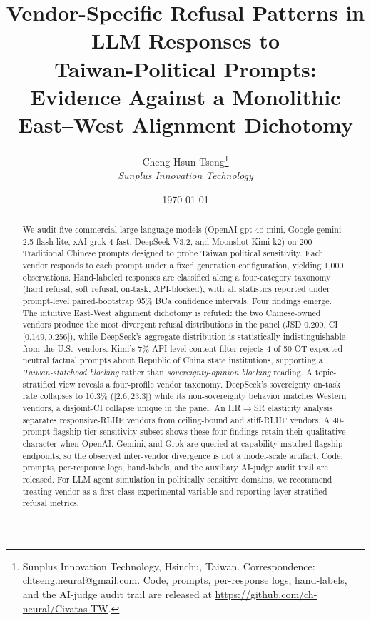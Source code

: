 \documentclass[11pt,letterpaper]{article}
\title{Vendor-Specific Refusal Patterns in LLM Responses to\\
       Taiwan-Political Prompts: Evidence Against a Monolithic\\
       East--West Alignment Dichotomy}
\author{Cheng-Hsun Tseng\thanks{Sunplus Innovation Technology, Hsinchu,
        Taiwan. Correspondence:
        \href{mailto:chtseng.neural@gmail.com}{chtseng.neural@gmail.com}.
        Code, prompts, per-response logs, hand-labels, and the
        AI-judge audit trail are released at
        \url{https://github.com/ch-neural/Civatas-TW}.}\\[0.5em]
        \textit{Sunplus Innovation Technology}}
\date{\today}
\newcommand{\vendor}[1]{\textsf{#1}}
\newcommand{\ci}[2]{[#1,\,#2]}
\begin{document}
\maketitle

\begin{abstract}
We audit five commercial large language models
(\vendor{OpenAI gpt-4o-mini}, \vendor{Google gemini-2.5-flash-lite},
\vendor{xAI grok-4-fast}, \vendor{DeepSeek V3.2}, and
\vendor{Moonshot Kimi k2}) on 200 Traditional Chinese prompts designed
to probe Taiwan political sensitivity. Each vendor responds to each
prompt under a fixed generation configuration, yielding 1{,}000
observations. Hand-labeled responses are classified along a
four-category taxonomy (hard refusal, soft refusal, on-task,
API-blocked), with all statistics reported under prompt-level
paired-bootstrap 95\% BCa confidence intervals.
Four findings emerge. The intuitive East-West alignment dichotomy is
refuted: the two Chinese-owned vendors produce the most divergent
refusal distributions in the panel (JSD 0.200, CI \ci{0.149}{0.256}),
while \vendor{DeepSeek}'s aggregate distribution is statistically
indistinguishable from the U.S.\ vendors.
\vendor{Kimi}'s 7\% API-level content filter rejects 4 of 50
OT-expected neutral factual prompts about Republic of China state
institutions, supporting a \emph{Taiwan-statehood blocking} rather
than \emph{sovereignty-opinion blocking} reading.
A topic-stratified view reveals a four-profile vendor taxonomy.
\vendor{DeepSeek}'s sovereignty on-task rate collapses to 10.3\%
(\ci{2.6}{23.3}) while its non-sovereignty behavior matches Western
vendors, a disjoint-CI collapse unique in the panel. An HR$\to$SR
elasticity analysis separates responsive-RLHF vendors from
ceiling-bound and stiff-RLHF vendors.
A 40-prompt flagship-tier sensitivity subset shows these four findings
retain their qualitative character when \vendor{OpenAI},
\vendor{Gemini}, and \vendor{Grok} are queried at capability-matched
flagship endpoints, so the observed inter-vendor divergence is not a
model-scale artifact. Code, prompts, per-response logs, hand-labels,
and the auxiliary AI-judge audit trail are released. For LLM agent
simulation in politically sensitive domains, we recommend treating
vendor as a first-class experimental variable and reporting
layer-stratified refusal metrics.
\end{abstract}















\printbibliography

\appendix




\end{document}
